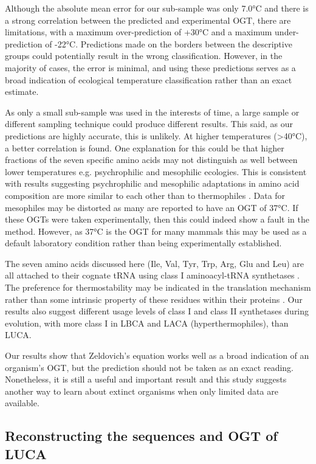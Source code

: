 Although the absolute mean error for our sub-sample was only 7.0°C and there is a strong correlation between the predicted and experimental OGT, there are limitations, with a maximum over-prediction of +30°C and a maximum under-prediction of -22°C. Predictions made on the borders between the descriptive groups could potentially result in the wrong classification. However, in the majority of cases, the error is minimal, and using these predictions serves as a broad indication of ecological temperature classification rather than an exact estimate.

As only a small sub-sample was used in the interests of time, a large sample or different sampling technique could produce different results. This said, as our predictions are highly accurate, this is unlikely. At higher temperatures (>40°C), a better correlation is found. One explanation for this could be that higher fractions of the seven specific amino acids may not distinguish as well between lower temperatures e.g. psychrophilic and mesophilic ecologies. This is consistent with results suggesting psychrophilic and mesophilic adaptations in amino acid composition are more similar to each other than to thermophiles \cite{saelensminde2007structure}. Data for mesophiles may be distorted as many are reported to have an OGT of 37°C. If these OGTs were taken experimentally, then this could indeed show a fault in the method. However, as 37°C is the OGT for many mammals this may be used as a default laboratory condition rather than being experimentally established.

The seven amino acids discussed here (Ile, Val, Tyr, Trp, Arg, Glu and Leu) are all attached to their cognate tRNA using class I aminoacyl-tRNA synthetases \cite{dutta2010analysis}. The preference for thermostability may be indicated in the translation mechanism rather than some intrinsic property of these residues within their proteins \cite{zeldovich2007}. Our results also suggest different usage levels of class I and class II synthetases during evolution, with more class I in LBCA and LACA (hyperthermophiles), than LUCA.

Our results show that Zeldovich's equation \cite{zeldovich2007} works well as a broad indication of an organism's OGT, but the prediction should not be taken as an exact reading. Nonetheless, it is still a useful and important result and this study suggests another way to learn about extinct organisms when only limited data are available. 


\subsection{Reconstructing the sequences and OGT of LUCA}

